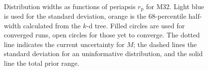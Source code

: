 \documentclass[useAMS,usedcolumn,usegraphicx,usenatbib]{mn2e}
\newcommand{\sub}[1]{\ensuremath{_\mathrm{#1}}}
\begin{document}
\begin{figure}
\begin{center}
 \quad
{} \\
\caption{Distribution widths as functions of periapsis $r\sub{p}$ for M32. Light blue is used for the standard deviation, orange is the $68$-percentile half-width calculated from the $k$-d tree. Filled circles are used for converged runs, open circles for those yet to converge. The dotted line indicates the current uncertainty for $M$; the dashed lines the standard deviation for an uninformative distribution, and the solid line the total prior range.\label{fig:sigmas-M32}}
\end{center}
\end{figure}
\end{document}
